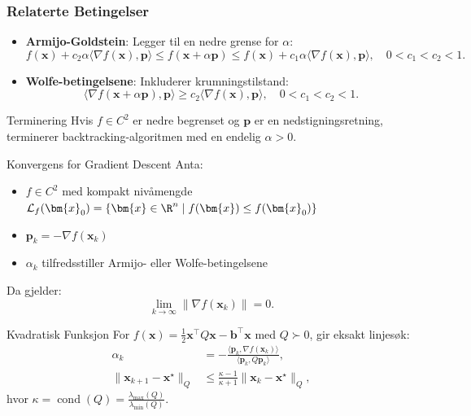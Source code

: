 \subsubsection*{Relaterte Betingelser}
\begin{itemize}
	\item \textbf{Armijo-Goldstein}: Legger til en nedre grense for \( \alpha \):
	      \[
		      f(\bm{x}) + c_2 \alpha \langle \nabla f(\bm{x}), \bm{p} \rangle \leq f(\bm{x} + \alpha \bm{p}) \leq f(\bm{x}) + c_1 \alpha \langle \nabla f(\bm{x}), \bm{p} \rangle, \quad 0 < c_1 < c_2 < 1.
	      \]

	\item \textbf{Wolfe-betingelsene}: Inkluderer krumningstilstand:
	      \[
		      \langle \nabla f(\bm{x} + \alpha \bm{p}), \bm{p} \rangle \geq c_2 \langle \nabla f(\bm{x}), \bm{p} \rangle, \quad 0 < c_1 < c_2 < 1.
	      \]
\end{itemize}

\begin{lemma}{Terminering}{}
	Hvis \( f \in C^2 \) er nedre begrenset og \( \bm{p} \) er en nedstigningsretning, terminerer backtracking-algoritmen med en endelig \( \alpha > 0 \).
\end{lemma}

\begin{theorem}{Konvergens for Gradient Descent}{}
	Anta:
	\begin{itemize}
		\item \( f \in C^2 \) med kompakt nivåmengde \( \mathcal{L}_f(\bm{x}_0) = \{\bm{x} \in \R^n \mid f(\bm{x}) \leq f(\bm{x}_0)\} \)
		\item \( \bm{p}_k = -\nabla f(\bm{x}_k) \)
		\item \( \alpha_k \) tilfredsstiller Armijo- eller Wolfe-betingelsene
	\end{itemize}
	Da gjelder:
	\[
		\lim_{k \to \infty} \|\nabla f(\bm{x}_k)\| = 0.
	\]
\end{theorem}

\begin{example}{Kvadratisk Funksjon}{}
	For \( f(\bm{x}) = \frac{1}{2} \bm{x}^\top Q \bm{x} - \bm{b}^\top \bm{x} \) med \( Q \succ 0 \), gir eksakt linjesøk:
	\begin{align*}
		\alpha_k                          & = -\frac{\langle \bm{p}_k, \nabla f(\bm{x}_k) \rangle}{\langle \bm{p}_k, Q \bm{p}_k \rangle}, \\
		\|\bm{x}_{k+1} - \bm{x}^\star\|_Q & \leq \frac{\kappa - 1}{\kappa + 1} \|\bm{x}_k - \bm{x}^\star\|_Q,
	\end{align*}
	hvor \( \kappa = \operatorname{cond}(Q) = \frac{\lambda_{\max}(Q)}{\lambda_{\min}(Q)} \).
\end{example}

